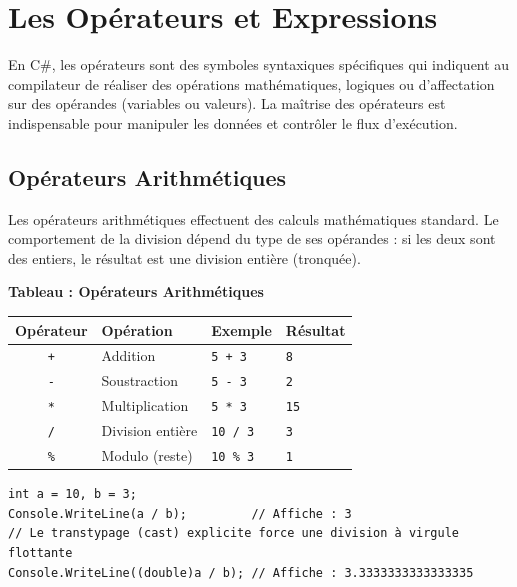 
\newpage
\section{Les Opérateurs et Expressions}

En C\#, les opérateurs sont des symboles syntaxiques spécifiques qui indiquent au compilateur de réaliser des opérations mathématiques, logiques ou d'affectation sur des opérandes (variables ou valeurs). La maîtrise des opérateurs est indispensable pour manipuler les données et contrôler le flux d'exécution.

\subsection{Opérateurs Arithmétiques}

Les opérateurs arithmétiques effectuent des calculs mathématiques standard. Le comportement de la division dépend du type de ses opérandes : si les deux sont des entiers, le résultat est une division entière (tronquée).

\begin{center}
    \textbf{Tableau : Opérateurs Arithmétiques} \\[0.3cm]
    \begin{tabular}{@{}cllp{5cm}@{}}
        \toprule
        \textbf{Opérateur} & \textbf{Opération} & \textbf{Exemple} & \textbf{Résultat} \\
        \midrule
        \texttt{+} & Addition & \texttt{5 + 3} & \texttt{8} \\
        \texttt{-} & Soustraction & \texttt{5 - 3} & \texttt{2} \\
        \texttt{*} & Multiplication & \texttt{5 * 3} & \texttt{15} \\
        \texttt{/} & Division entière & \texttt{10 / 3} & \texttt{3} \\
        \texttt{\%} & Modulo (reste) & \texttt{10 \% 3} & \texttt{1} \\
        \bottomrule
    \end{tabular}
\end{center}

\begin{lstlisting}[caption={Division entière vs Division flottante}]
int a = 10, b = 3;
Console.WriteLine(a / b);         // Affiche : 3
// Le transtypage (cast) explicite force une division à virgule flottante
Console.WriteLine((double)a / b); // Affiche : 3.3333333333333335
\end{lstlisting}

